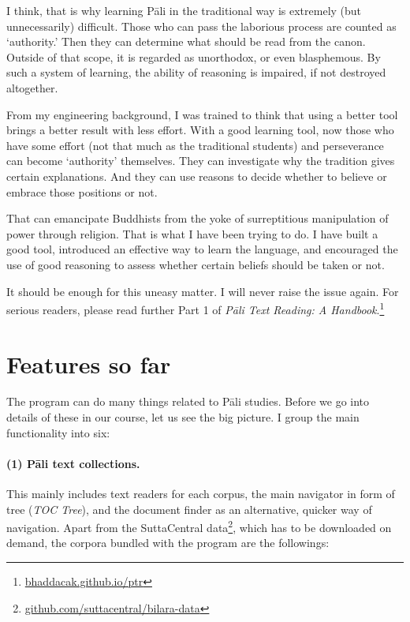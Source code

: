 I think, that is why learning Pāli in the traditional way is extremely (but unnecessarily) difficult. Those who can pass the laborious process are counted as `authority.' Then they can determine what should be read from the canon. Outside of that scope, it is regarded as unorthodox, or even blasphemous. By such a system of learning, the ability of reasoning is impaired, if not destroyed altogether.

From my engineering background, I was trained to think that using a better tool brings a better result with less effort. With a good learning tool, now those who have some effort (not that much as the traditional students) and perseverance can become `authority' themselves. They can investigate why the tradition gives certain explanations. And they can use reasons to decide whether to believe or embrace those positions or not.

That can emancipate Buddhists from the yoke of surreptitious manipulation of power through religion. That is what I have been trying to do. I have built a good tool, introduced an effective way to learn the language, and encouraged the use of good reasoning to assess whether certain beliefs should be taken or not.

It should be enough for this uneasy matter. I will never raise the issue again. For serious readers, please read further Part 1 of \emph{Pāli Text Reading: A Handbook}.\footnote{\url{bhaddacak.github.io/ptr}}

\section{Features so far}

The program can do many things related to Pāli studies. Before we go into details of these in our course, let us see the big picture. I group the main functionality into six:

\paragraph{(1) Pāli text collections.} This mainly includes text readers for each corpus, the main navigator in form of tree (\emph{TOC Tree}), and the document finder as an alternative, quicker way of navigation. Apart from the SuttaCentral data\footnote{\url{github.com/suttacentral/bilara-data}}, which has to be downloaded on demand, the corpora bundled with the program are the followings:

